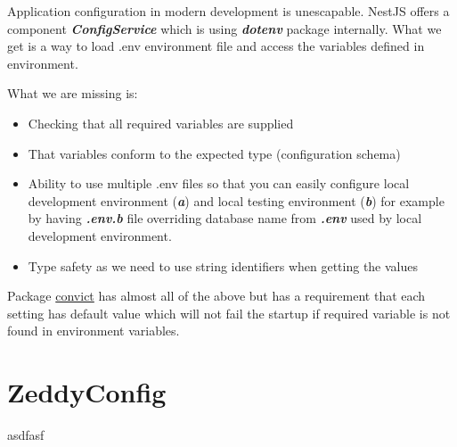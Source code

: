 \documentclass[lang=en,color=green]{elegantbook}
\newcommand{\bi}[1]{\textit{\textbf{#1}}}
\begin{document}
Application configuration in modern development is unescapable. NestJS 
offers a component \bi{ConfigService} which is using \bi{dotenv} package internally.
What we get is a way to load .env environment file and access the variables
defined in environment.

What we are missing is:
\begin{itemize}
    \item Checking that all required variables are supplied
    \item That variables conform to the expected type (configuration schema)
    \item Ability to use multiple .env files so that you can easily configure 
    local development environment (\bi{a}) and local testing environment (\bi{b})
    for example by having \bi{.env.b} file overriding database name from \bi{.env} 
    used by local development environment.
    \item Type safety as we need to use string identifiers when getting the 
    values
\end{itemize}

Package \href{https://www.npmjs.com/package/convict}{convict} has almost all
of the above but has a requirement that each setting has default value 
which will not fail the startup if required variable is not found in 
environment variables.

\section*{ZeddyConfig}
asdfasf
\end{document}
